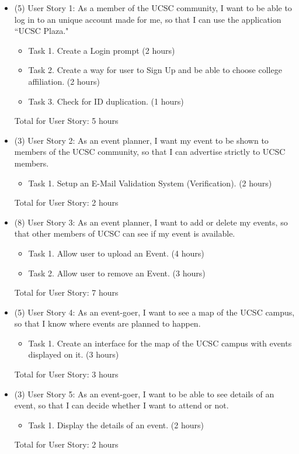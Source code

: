 \documentclass[10pt]{article}
\begin{document}
        \begin{itemize}
            \item (5) User Story 1: As a member of the UCSC community, I want to be able to log in to an unique account made for me, so that I can use the application ``UCSC Plaza."

                \begin{itemize}
                    \item Task 1. Create a Login prompt (2 hours)
                    \item Task 2. Create a way for user to Sign Up and be able to choose college affiliation. (2 hours)
                    \item Task 3. Check for ID duplication. (1 hours)
                \end{itemize}        
                Total for User Story: 5 hours
            \item (3) User Story 2: As an event planner, I want my event to be shown to members of the UCSC community, so that I can advertise strictly to UCSC members.
            
                \begin{itemize}
                    \item Task 1. Setup an E-Mail Validation System (Verification). (2 hours)
                \end{itemize}
                Total for User Story: 2 hours
            \item (8) User Story 3: As an event planner, I want to add or delete my events, so that other members of UCSC can see if my event is available.
            
                \begin{itemize}
                    \item Task 1. Allow user to upload an Event. (4 hours)
                    \item Task 2. Allow user to remove an Event. (3 hours)
                \end{itemize}
                Total for User Story: 7 hours
            \item (5) User Story 4: As an event-goer, I want to see a map of the UCSC campus, so that I know where events are planned to happen.
            
                \begin{itemize}
                    \item Task 1. Create an interface for the map of the UCSC campus with events displayed on it. (3 hours)
                \end{itemize}
                Total for User Story: 3 hours
            \item (3) User Story 5: As an event-goer, I want to be able to see details of an event, so that I can decide whether I want to attend or not.
        
                \begin{itemize}
                    \item Task 1. Display the details of an event. (2 hours)
                \end{itemize}
                Total for User Story: 2 hours
        \end{itemize}
     
\end{document}
